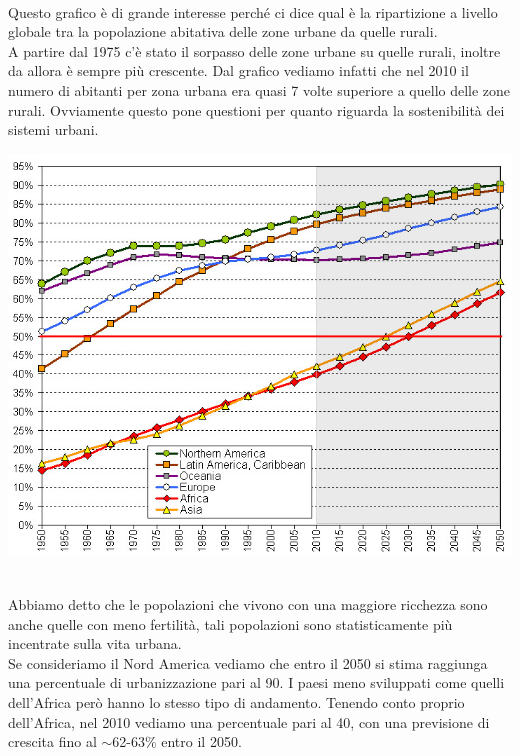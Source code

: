 \documentclass[a4paper,12pt, oneside]{book}
\begin{document}
\leavevmode\\
Questo grafico è di grande interesse perché ci dice qual è la ripartizione a livello globale tra la popolazione abitativa delle zone urbane da quelle rurali.\\
A partire dal 1975 c'è stato il sorpasso delle zone urbane su quelle rurali, inoltre da allora è sempre più crescente. Dal grafico vediamo infatti che nel 2010 il numero di abitanti per zona urbana era quasi 7 volte superiore a quello delle zone rurali. Ovviamente questo pone questioni per quanto riguarda la sostenibilità dei sistemi urbani.
\leavevmode\\
 \begin{center}
   \includegraphics[width=0.7\linewidth]{"Immagini/worldurbanpop"}
 \end{center}
\leavevmode\\
Abbiamo detto che le popolazioni che vivono con una maggiore ricchezza sono anche quelle con meno fertilità, tali popolazioni sono statisticamente più incentrate sulla vita urbana.\\
Se consideriamo il Nord America vediamo che entro il 2050 si stima raggiunga una percentuale di urbanizzazione pari al 90\textdiscount. I paesi meno sviluppati come quelli dell'Africa però hanno lo stesso tipo di andamento. Tenendo conto proprio dell'Africa, nel 2010 vediamo una percentuale pari al 40\textdiscount, con una previsione di crescita fino al $\sim$62-63\% entro il 2050.
\leavevmode\\
\end{document}
